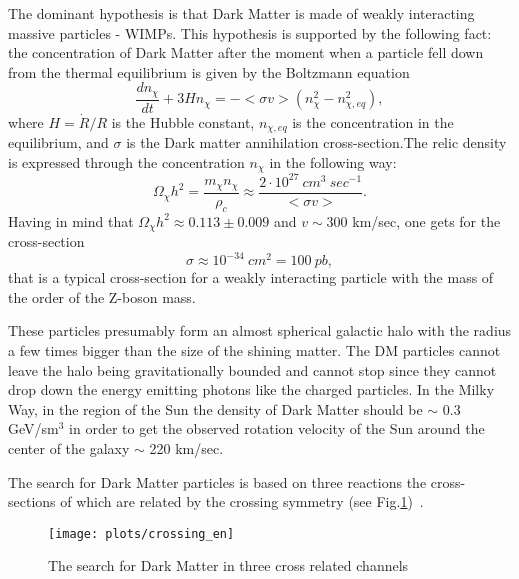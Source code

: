 \documentclass{cernyrep}
\begin{document}
The dominant hypothesis is that Dark Matter is made of weakly interacting massive particles - WIMPs. 
This hypothesis is supported by the following fact: the concentration of Dark Matter after the moment when a particle fell down from the thermal equilibrium is given by the Boltzmann equation~\cite{abun}
\begin{equation}
\frac{dn_\chi}{dt}+ 3 H n_\chi = - < \sigma v > ( n^2_\chi- n^2_{\chi,eq}),	
\end{equation}
where $H = \dot{R}/ R$  is the Hubble constant, $n_{\chi,eq}$ is the concentration in the equilibrium, and $\sigma$  is the Dark matter annihilation cross-section.The relic density is expressed through the concentration   $n_\chi$  in the following way:
\begin{equation}
\Omega_\chi h^2 =\frac{m_\chi n_\chi}{\rho_c}\approx \frac{2\cdot 10^{27}\ cm^3\ sec^{-1}}{<\sigma v>}.
\end{equation}
Having in mind that $\Omega_\chi h^2 \approx 0.113\pm 0.009$ and $v\sim 300$ km/sec,  one gets for the cross-section
\begin{equation}
\sigma\approx 10^{-34}\ cm^2 = 100\ pb,
\end{equation}
that is a typical cross-section for a weakly interacting particle with the mass of the order of the Z-boson mass.

These particles presumably  form an almost spherical galactic halo with the radius a few times bigger than the size of the shining matter. The DM particles cannot leave the halo being gravitationally bounded and cannot stop since they cannot drop down the energy emitting photons like the charged particles.  In the Milky Way, in the region of the Sun the density of Dark Matter should be   $\sim$ 0.3 GeV/sm$^3$ in order to get the observed rotation velocity of the Sun around the center of the galaxy $\sim$ 220 km/sec.

The search for Dark Matter particles is based on three reactions the cross-sections of which are related by the crossing symmetry (see Fig.\ref{DMsearch})~\cite{Kolb}.
\begin{figure}[h]
\begin{center}%
\leavevmode
\texttt{[image: plots/crossing\_en]}
\end{center}\vspace{-0.5cm}
\caption{The search for Dark Matter in three cross related channels}
\label{DMsearch}
\end{figure}
\end{document}
